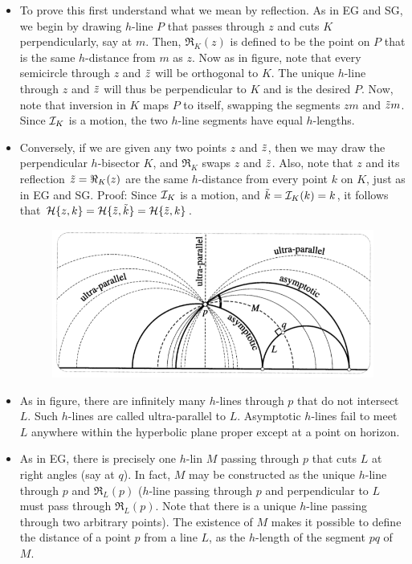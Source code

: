 \documentclass[12pt]{article}
\def\mc{\ensuremath\mathcal}
\def\td{\ensuremath\tilde}
\begin{document}
\begin{itemize}
    \item To prove this first understand what we mean by reflection. As in EG and SG, we begin by drawing $h$-line $P$ that passes through $z$ and cuts $K$ perpendicularly, say at $m$. Then, $\Re_{K}(z)$ is defined to be the point on $P$ that is the same $h$-distance from $m$ as $z$. Now as in figure, note that every semicircle through $z$ and $\td{z}$ will be orthogonal to $K$. The unique $h$-line through $z$ and $\td{z}$ will thus be perpendicular to $K$ and is the desired $P$. Now, note that inversion in $K$ maps $P$ to itself, swapping the segments $zm$ and $\td{z}m$. Since $\mc{I}_K$ is a motion, the two $h$-line segments have equal $h$-lengths.

    \item Conversely, if we are given any two points $z$ and $\td{z}$, then we may draw the perpendicular $h$-bisector $K$, and $\Re_{K}$ swaps $z$ and $\td{z}$. Also, note that $z$ and its reflection $\td{z}=\Re_{K}(z)$ are the same $h$-distance from every point $k$ on $K$, just as in EG and SG. Proof: Since $\mc{I}_K$ is a motion, and $\td{k} = \mc{I}_{K}(k)=k$, it follows that $\mc{H}\{z,k\} = \mc{H}\{\td{z},\td{k}\} = \mc{H}\{\td{z},k\}$.

    \begin{figure}[h!]
        \centering
        \includegraphics[scale=0.7]{fig_19}
        \label{fig_19}
    \end{figure}
    
    \item As in figure, there are infinitely many $h$-lines through $p$ that do not intersect $L$. Such $h$-lines are called ultra-parallel to $L$. Asymptotic $h$-lines fail to meet $L$ anywhere within the hyperbolic plane proper except at a point on horizon.

    \item As in EG, there is precisely one $h$-lin $M$ passing through $p$ that cuts $L$ at right angles (say at $q$). In fact, $M$ may be constructed as the unique $h$-line through $p$ and $\Re_{L}(p)$ ($h$-line passing through $p$ and perpendicular to $L$ must pass through $\Re_{L}(p)$. Note that there is a unique $h$-line passing through two arbitrary points). The existence of $M$ makes it possible to define the distance of a point $p$ from a line $L$, as the $h$-length of the segment $pq$ of $M$.


\end{itemize}
\end{document}
